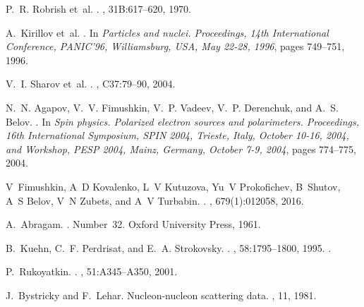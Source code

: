 \begin{thebibliography}{10}
  P.~R. Robrish et~al.
  .
  , 31B:617--620, 1970.

  A.~Kirillov et~al.
  .
  \newblock In {\em {Particles and nuclei. Proceedings, 14th International
      Conference, PANIC'96, Williamsburg, USA, May 22-28, 1996}}, pages 749--751,
  1996.

  V.~I. Sharov et~al.
  .
  , C37:79--90, 2004.

  N.~N. Agapov, V.~V. Fimushkin, V.~P. Vadeev, V.~P. Derenchuk, and A.~S. Belov.
  .
  \newblock In {\em {Spin physics. Polarized electron sources and polarimeters.
      Proceedings, 16th International Symposium, SPIN 2004, Trieste, Italy, October
      10-16, 2004, and Workshop, PESP 2004, Mainz, Germany, October 7-9, 2004}},
  pages 774--775, 2004.

  V~Fimushkin, A~D Kovalenko, L~V Kutuzova, Yu~V Prokofichev, B~Shutov, A~S
  Belov, V~N Zubets, and A~V Turbabin.
  .
  , 679(1):012058, 2016.

  A.~Abragam.
  .
  \newblock Number~32. Oxford University Press, 1961.

  B.~Kuehn, C.~F. Perdrisat, and E.~A. Strokovsky.
  .
  , 58:1795--1800, 1995.
  .

  P.~Rukoyatkin.
  .
  , 51:A345--A350, 2001.

  J.~Bystricky and F.~Lehar.
  \newblock Nucleon-nucleon scattering data.
  , 11, 1981.


\end{thebibliography}

